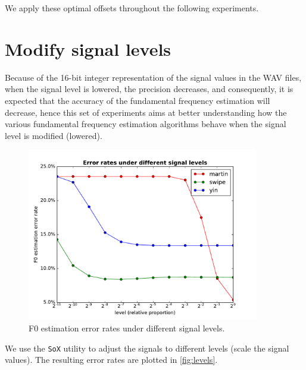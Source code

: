 \documentclass[11pt,a4paper]{report}
\begin{document}
We apply these optimal offsets throughout the following experiments.

\section{Modify signal levels}

Because of the 16-bit integer representation of the signal values in the WAV files, when the signal level is lowered, the precision decreases, and consequently, it is expected that the accuracy of the fundamental frequency estimation will decrease, hence this set of experiments aims at better understanding how the various fundamental frequency estimation algorithms behave when the signal level is modified (lowered).

\begin{figure}[htbp]
  \centering
  \includegraphics[width=0.9\textwidth]{error_rates_vs_signal_levels.pdf}
  \caption{F0 estimation error rates under different signal levels.} \label{fig:levels}
\end{figure}

We use the \texttt{SoX} utility to adjust the signals to different levels (scale the signal values).
The resulting error rates are plotted in \autoref{fig:levels}.
\end{document}
